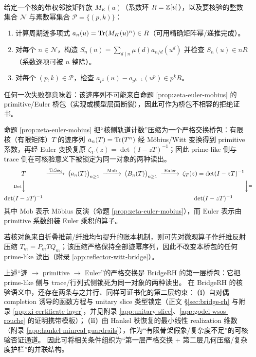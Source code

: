 \begin{algorithm}\label{alg:self-audit-witt-bridge}
给定一个核的带权邻接矩阵族 $M_K(u)$（系数环 $R=\mathbb{Z}[u]$），以及要核验的整数集合 $\mathcal N$ 与素数幂集合 $\mathcal P=\{(p,k)\}$：
\begin{enumerate}[label=(\arabic*), ref=\arabic*]
  \item 计算周期迹多项式 $a_n(u)=\mathrm{Tr}(M_K(u)^n)\in R$（可用精确矩阵幂/递推完成）。
  \item 对每个 $n\in\mathcal N$，构造 $S_n(u)=\sum_{d\mid n}\mu(d)a_{n/d}(u^d)$ 并检查 $S_n(u)\in nR$（系数逐项可被 $n$ 整除）。
  \item 对每个 $(p,k)\in\mathcal P$，检查 $a_{p^k}(u)-a_{p^{k-1}}(u^p)\in p^kR$。
\end{enumerate}
任何一次失败都意味着：该迹序列不可能来自命题 \ref{prop:zeta-euler-mobius} 的 primitive/Euler 桥包（实现或模型层面断裂），因此可作为桥包不相容的拒绝证书。
\end{algorithm}

\begin{remark}\label{rem:trace-primitive-euler-commuting}
命题 \ref{prop:zeta-euler-mobius} 把“核侧轨道计数”压缩为一个严格交换桥包：有限核（有限矩阵）$T$ 的迹序列 $a_n(T)=\mathrm{Tr}(T^n)$ 经 Möbius/Witt 变换得到 primitive 系数，再经 Euler 变换复原 $\zeta_T(z)=\det(I-zT)^{-1}$；因此 prime-like 侧与 trace 侧在可核验意义下被锁定为同一对象的两种读出。
\[
\begin{CD}
T @>\mathrm{TrSeq}>> \bigl(a_n(T)\bigr)_{n\ge 1} @>\mathrm{Mob}>> \bigl(B_n(T)\bigr)_{n\ge 1} @>\mathrm{Euler}>> \zeta_T(z)=\det(I-zT)^{-1}\\
@V\mathrm{Det}VV @. @. @. @VV=V\\
\det(I-zT)^{-1} @. @. @. \det(I-zT)^{-1}
\end{CD}
\]
\noindent 其中 $\mathrm{Mob}$ 表示 Möbius 反演（命题 \ref{prop:zeta-euler-mobius}），而 $\mathrm{Euler}$ 表示由 primitive 系数组装 Euler 乘积的算子。
\par
若核对象来自折叠推前/纤维均匀提升的账本机制，则可先对微观算子作纤维反射压缩 $\overline T_m=P_mTQ_m$；该压缩严格保持全部迹幂序列，因此不改变本桥包的任何 prime-like 读出（附录 \ref{app:reflector-witt-bridge}）。
\end{remark}

\begin{remark}\label{rem:two-layer-bridge-pack}
上述“迹 $\to$ primitive $\to$ Euler”的严格交换是 BridgeRH 的第一层桥包：它把 prime-like 侧与 trace/行列式侧锁死为同一对象的两种读出。
在 BridgeRH 的核验语义中，还存在两条与之并行、同样可证书化的第二层约束：
\textbf{(i)}~自对偶 completion 诱导的函数方程与 unitary slice 类型锁定（正文 \S\ref{sec:bridge-rh} 与附录 \ref{app:xi-certificate-layer}，并见附录 \ref{app:unitary-slice}、\ref{app:godel-wsos-rouche} 的证明携带模板）；
\textbf{(ii)}~由 Hankel 秩恢复的最小线性 realization 维数（附录 \ref{app:hankel-minreal-guardrails}），作为“有限骨架假象/复杂度不足”的可核验否证通道。
因此可将相关条件组织为“第一层严格交换 + 第二层几何压缩/复杂度护栏”的并联结构。
\end{remark}

